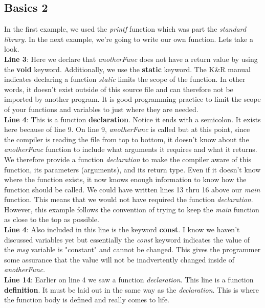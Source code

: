 \documentclass[../main.tex]{subfiles}
\begin{document}
\subsection{Basics 2}
In the first example, we used the \textit{printf} function which was part the \textit{standard library}.  In the next example, we're going to write our own function.  Lets take a look.
\\


\textbf{Line 3}: Here we declare that \textit{anotherFunc} does not have a return value by using the \textbf{void} keyword. Additionally, we use the \textbf{static} keyword. The K\&R manual \cite{kr_manual} indicates declaring a function \textit{static} limits the scope of the function.  In other words, it doesn't exist outside of this source file and can therefore not be imported by another program. It is good programming practice to limit the scope of your functions and variables to just where they are needed.\\
\textbf{Line 4}: This is a function \textbf{declaration}.  Notice it ends with a semicolon.  It exists here because of line 9.  On line 9, \textit{anotherFunc} is called but at this point, since the compiler is reading the file from top to bottom, it doesn't know about the \textit{anotherFunc} function to include what arguments it requires and what it returns.  We therefore provide a function \textit{declaration} to make the compiler aware of this function, its parameters (arguments), and its return type.  Even if it doesn't know where the function exists, it now knows enough information to know how the function should be called.  We could have written lines 13 thru 16 above our \textit{main} function.  This means that we would not have required the function \textit{declaration}.  However, this example follows the convention of trying to keep the \textit{main} function as close to the top as possible.\\
\textbf{Line 4}: Also included in this line is the keyword \textbf{const}.  I know we haven't discussed variables yet but essentially the \textit{const} keyword indicates the value of the \textit{msg} variable is "constant" and cannot be changed. This gives the programmer some assurance that the value will not be inadvertently changed inside of \textit{anotherFunc}.\\
\textbf{Line 14}:  Earlier on line 4 we saw a function \textit{declaration}.  This line is a function \textbf{definition}.  It must be laid out in the same way as the \textit{declaration}.  This is where the function body is defined and really comes to life.\\
\end{document}
